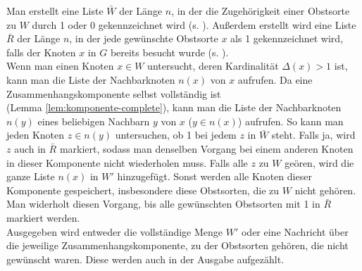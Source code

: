 Man erstellt eine Liste $\bar{W}$ der Länge $n$,
in der die Zugehörigkeit einer Obstsorte zu $W$ durch 1 oder 0 gekennzeichnet wird
(s. ). Außerdem erstellt wird eine Liste $\bar{R}$ der Länge $n$,
in der jede gewünschte Obstsorte $x$ als 1 gekennzeichnet wird, falls der Knoten $x$ in $G$ bereits
besucht wurde (s. ).\\

Wenn man einen Knoten $x \in W$ untersucht, deren Kardinalität $\Delta(x) > 1$ ist,
kann man die Liste der Nachbarknoten $n(x)$ von $x$ aufrufen.
Da eine Zusammenhangskomponente selbst vollständig ist\\ (Lemma \ref{lem:komponente-complete}),
kann man die Liste der Nachbarknoten $n(y)$ eines beliebigen Nachbarn $y$ von $x$ ($y \in n(x)$) aufrufen.
So kann man jeden Knoten $z \in n(y)$ untersuchen, ob 1 bei jedem $z$ in $\bar{W}$ steht.
Falls ja, wird $z$ auch in $\bar{R}$ markiert,
sodass man denselben Vorgang bei einem anderen Knoten in dieser Komponente nicht wiederholen muss.
Falls alle $z$ zu $W$ geören, wird
die ganze Liste $n(x)$ in $W'$ hinzugefügt. Sonst werden alle Knoten dieser Komponente 
gespeichert, insbesondere diese Obstsorten, die zu $W$ nicht gehören.\\
Man widerholt diesen Vorgang, bis alle gewünschten Obstsorten mit 1 in $\bar{R}$ markiert werden.\\

Ausgegeben wird entweder die vollständige Menge $W'$ oder eine Nachricht über die jeweilige 
Zusammenhangskomponente, zu der Obstsorten gehören, die nicht gewünscht waren.
Diese werden auch in der Ausgabe aufgezählt.
